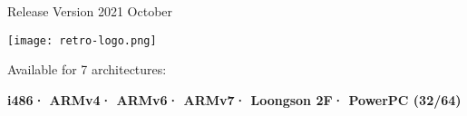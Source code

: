 


    \pagestyle{empty}
    \raggedbottom


    
    \hspace{1pt}
    \vspace{10pt}
    

    \color{white}
    \pagecolor{black}

        {\Huge{}\fontsize{40pt}{50pt}\selectfont\doctitleA}

        \vspace{15pt}
        {\huge\mdseries\itshape{\tpOptiInstMedia}}
        
        \vspace{40pt}
        \large
        {\sffamily Release Version 2021 October}

        \texttt{[image: retro-logo.png]}

        \vspace{40pt}
        \mdseries\sffamily
        Available for 7 architectures:\vspace{3pt}

        \color{white}\bfseries
        {i486}\hspace{3pt}·\hspace{3pt}
        {ARMv4}\hspace{3pt}·\hspace{3pt}
        {ARMv6}\hspace{3pt}·\hspace{3pt}
        {ARMv7}\hspace{3pt}·\hspace{3pt}
        {Loongson 2F}\hspace{3pt}·\hspace{3pt}
        {PowerPC (32/64)}


